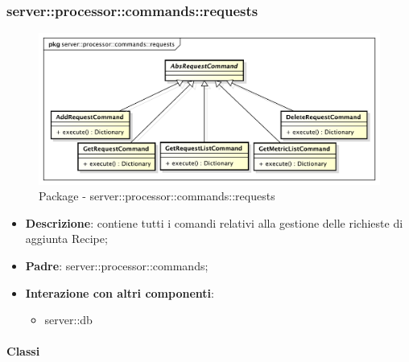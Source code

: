       \subsubsection{server::processor::commands::requests} %
      \label{ssub:bdsm_app_server_processor_commands_requests}
      \begin{figure}[!htbp]
      	\centering
      	\centerline{\includegraphics[scale=0.5]{./images/server/requests.pdf}}
      	\caption{Package - server::processor::commands::requests}
      \end{figure}

      \begin{itemize}
        \item \textbf{Descrizione}: contiene tutti i comandi relativi alla gestione delle richieste di aggiunta Recipe;
        \item \textbf{Padre}: server::processor::commands;
        \item \textbf{Interazione con altri componenti}:
          \begin{itemize}
            \item server::db
          \end{itemize}
      \end{itemize}

        \paragraph{Classi} %

